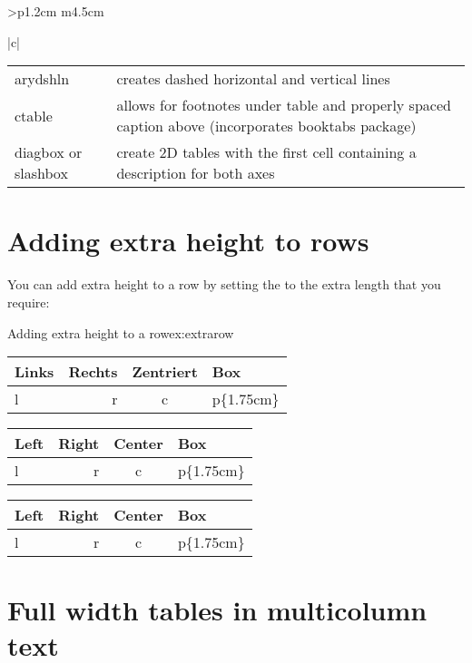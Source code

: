 \begin{tabular}{>{\bfseries}p{1.2cm} m{4.5cm}}
\begin{tabular}[t]{|c|}
\begin{longtable}
\begin{longtable}{lp{7cm}}
arydshln &creates dashed horizontal and vertical lines\\

ctable &allows for footnotes under table and properly spaced caption above (incorporates booktabs package)\\

diagbox or slashbox &create 2D tables with the first cell containing a description for both axes\\
\bottomrule
\end{longtable}


\clearpage

\section{Adding extra height to rows}

You can add extra height to a row by setting the  to the extra length that you require:


\begin{texexample}{Adding extra height to a row}{ex:extrarow}
\setlength\extrarowheight{2pt}
\begin{tabular}{|l|r|c|p{1.75cm}|}\hline
  Links & Rechts & Zentriert & Box\\\hline
  \rowcolor{thegray}
  l & r & c & p\{1.75cm\}\\\hline
\end{tabular}
\end{texexample}

\bigskip

{
\setlength\extrarowheight{2pt}
\begin{tabular}{|l|r|c|p{1.75cm}|}\hline
Left & Right & Center & Box\\\hline
\rowcolor{cyan!40}
l & r & c & p\{1.75cm\}\\\hline
\end{tabular}
}
{
\setlength\extrarowheight{0pt}
\begin{tabular}{|l|r|c|p{1.75cm}|}\hline
Left & Right & Center & Box\\\hline
\rowcolor{cyan!40}
l & r & c & p\{1.75cm\}\\\hline
\end{tabular}
}

\section{Full width tables in multicolumn text}


\end{longtable}
\end{tabular}
\end{tabular}
